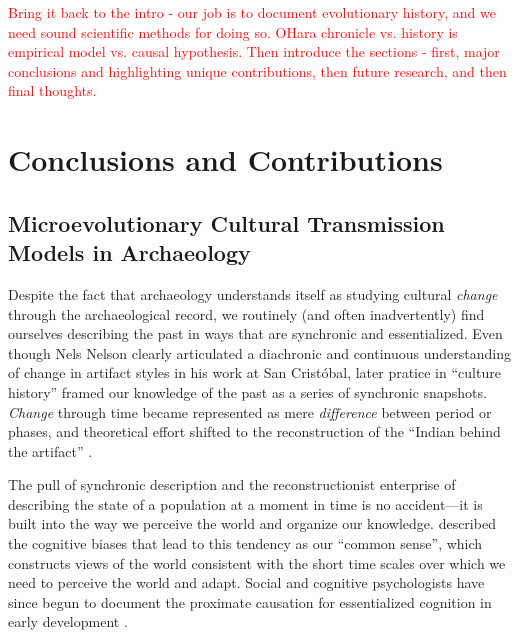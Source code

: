 

\textcolor{red}{Bring it back to the intro - our job is to document evolutionary history, and we need sound scientific methods for doing so.  OHara chronicle vs. history is empirical model vs. causal hypothesis.  Then introduce the sections - first, major conclusions and highlighting unique contributions, then future research, and then final thoughts.}


\section{Conclusions and Contributions}\label{conc:sec:research-conclusions}

\subsection{Microevolutionary Cultural Transmission Models in Archaeology}\label{conc:sec:conc-microevolutionary}

Despite the fact that archaeology understands itself as studying cultural \emph{change} through the archaeological record, we routinely (and often inadvertently) find ourselves describing the past in ways that are synchronic and essentialized.  Even though Nels Nelson \citeyearpar{Nelson1916} clearly articulated a diachronic and continuous understanding of change in artifact styles in his work at San Crist\'obal, later pratice in ``culture history'' framed our knowledge of the past as a series of synchronic snapshots.  \emph{Change} through time became represented as mere \emph{difference} between period or phases, and theoretical effort shifted to the reconstruction of the ``Indian behind the artifact'' \citep[79]{braidwood1959archeology}.  

The pull of synchronic description and the reconstructionist enterprise of describing the state of a population at a moment in time is no accident---it is built into the way we perceive the world and organize our knowledge.   \citet{Dunnell1982} described the cognitive biases that lead to this tendency as our ``common sense'', which constructs views of the world consistent with the short time scales over which we need to perceive the world and adapt.  Social and cognitive psychologists have since begun to document the proximate causation for essentialized cognition in early development .  

